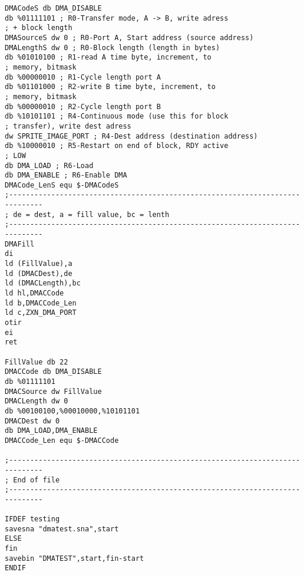 \begin{multicols}{2}
\begin{enumerate}
\begin{verbatim}
DMACodeS db DMA_DISABLE
db %01111101 ; R0-Transfer mode, A -> B, write adress
; + block length
DMASourceS dw 0 ; R0-Port A, Start address (source address)
DMALengthS dw 0 ; R0-Block length (length in bytes)
db %01010100 ; R1-read A time byte, increment, to
; memory, bitmask
db %00000010 ; R1-Cycle length port A
db %01101000 ; R2-write B time byte, increment, to
; memory, bitmask
db %00000010 ; R2-Cycle length port B
db %10101101 ; R4-Continuous mode (use this for block
; transfer), write dest adress
dw SPRITE_IMAGE_PORT ; R4-Dest address (destination address)
db %10000010 ; R5-Restart on end of block, RDY active
; LOW
db DMA_LOAD ; R6-Load
db DMA_ENABLE ; R6-Enable DMA
DMACode_LenS equ $-DMACodeS
;------------------------------------------------------------------------------
; de = dest, a = fill value, bc = lenth
;------------------------------------------------------------------------------
DMAFill
di
ld (FillValue),a
ld (DMACDest),de
ld (DMACLength),bc
ld hl,DMACCode
ld b,DMACCode_Len
ld c,ZXN_DMA_PORT
otir
ei
ret

FillValue db 22
DMACCode db DMA_DISABLE
db %01111101
DMACSource dw FillValue
DMACLength dw 0
db %00100100,%00010000,%10101101
DMACDest dw 0
db DMA_LOAD,DMA_ENABLE
DMACCode_Len equ $-DMACCode

;------------------------------------------------------------------------------
; End of file
;------------------------------------------------------------------------------

IFDEF testing
savesna "dmatest.sna",start
ELSE
fin
savebin "DMATEST",start,fin-start
ENDIF
\end{verbatim}
\end{enumerate}
\einset
\end{multicols}
